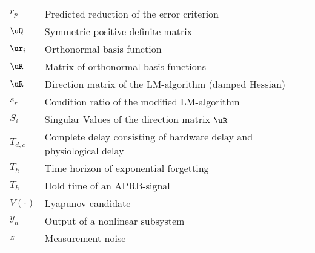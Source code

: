 \begin{longtable}[l]{ll}
$r_p$													& Predicted reduction of the error criterion\\
$\uQ$													& Symmetric positive definite matrix\\
$\ur_i$												& Orthonormal basis function\\
$\uR$													& Matrix of orthonormal basis functions\\
$\uR$													& Direction matrix of the LM-algorithm (damped Hessian)\\
$s_r$													& Condition ratio of the modified LM-algorithm\\
$S_i$													& Singular Values of the direction matrix $\uR$\\ 
$T_{d,c}$											& Complete delay consisting of hardware delay and physiological delay\\
$T_h$   											& Time horizon of exponential forgetting\\
$T_h$   											& Hold time of an APRB-signal\\
$V(\cdot)$										& Lyapunov candidate\\
$y_n$       									& Output of a nonlinear subsystem\\
$z$         									& Measurement noise\\


\end{longtable}
